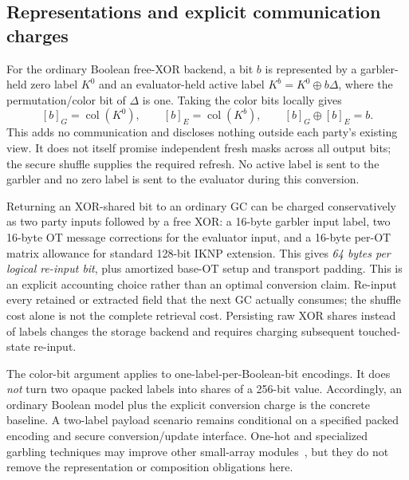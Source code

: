 \documentclass[11pt]{article}
\begin{document}
\subsection{Representations and explicit communication charges}

For the ordinary Boolean free-XOR backend, a bit $b$ is represented by a
garbler-held zero label $K^0$ and an evaluator-held active label
$K^b=K^0\oplus b\Delta$, where the permutation/color bit of $\Delta$ is
one.  Taking the color bits locally gives
\[
 [b]_G=\operatorname{col}(K^0),\qquad
 [b]_E=\operatorname{col}(K^b),\qquad
 [b]_G\oplus[b]_E=b.
\]
This adds no communication and discloses nothing outside each party's
existing view.  It does not itself promise independent fresh masks across
all output bits; the secure shuffle supplies the required refresh.  No
active label is sent to the garbler and no zero label is sent to the
evaluator during this conversion.

Returning an XOR-shared bit to an ordinary GC can be charged conservatively
as two party inputs followed by a free XOR: a 16-byte garbler input label,
two 16-byte OT message corrections for the evaluator input, and a 16-byte
per-OT matrix allowance for standard 128-bit IKNP extension.  This gives
\emph{64 bytes per logical re-input bit}, plus amortized base-OT setup and
transport padding.  This is an explicit accounting choice rather than an
optimal conversion claim.  Re-input every retained or extracted field that
the next GC actually consumes; the shuffle cost alone is not the complete
retrieval cost.  Persisting raw XOR shares instead of labels changes the
storage backend and requires charging subsequent touched-state re-input.

The color-bit argument applies to one-label-per-Boolean-bit encodings.
It does \emph{not} turn two opaque packed labels into shares of a 256-bit
value.  Accordingly, an ordinary Boolean model plus the explicit conversion
charge is the concrete baseline.  A two-label payload scenario remains
conditional on a specified packed encoding and secure conversion/update
interface.  One-hot and specialized garbling techniques may improve other
small-array modules~\cite{heath2024,heath2021}, but they do not remove the
representation or composition obligations here.
\end{document}
